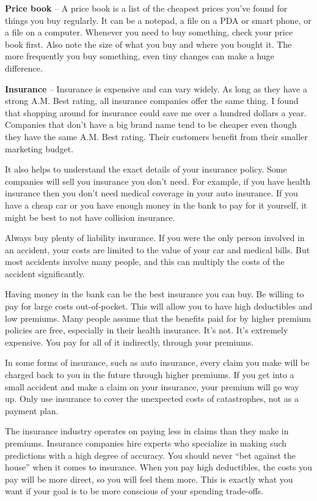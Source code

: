 \textbf{Price book} -- A price book is a list of the cheapest prices you've found for things you buy regularly. It can be a notepad, a file on a PDA or smart phone, or a file on a computer. Whenever you need to buy something, check your price book first. Also note the size of what you buy and where you bought it. The more frequently you buy something, even tiny changes can make a huge difference.

\textbf{Insurance} -- Insurance is expensive and can vary widely. As long as they have a strong A.M. Best rating, all insurance companies offer the same thing. I found that shopping around for insurance could save me over a hundred dollars a year. Companies that don't have a big brand name tend to be cheaper even though they have the same A.M. Best rating. Their customers benefit from their smaller marketing budget.

It also helps to understand the exact details of your insurance policy. Some companies will sell you insurance you don't need. For example, if you have health insurance then you don't need medical coverage in your auto insurance. If you have a cheap car or you have enough money in the bank to pay for it yourself, it might be best to not have collision insurance.

Always buy plenty of liability insurance. If you were the only person involved in an accident, your costs are limited to the value of your car and medical bills. But most accidents involve many people, and this can multiply the costs of the accident significantly.

Having money in the bank can be the best insurance you can buy. Be willing to pay for large costs out-of-pocket. This will allow you to have high deductibles and low premiums. Many people assume that the benefits paid for by higher premium policies are free, especially in their health insurance. It's not. It's extremely expensive. You pay for all of it indirectly, through your premiums.

In some forms of insurance, such as auto insurance, every claim you make will be charged back to you in the future through higher premiums. If you get into a small accident and make a claim on your insurance, your premium will go way up. Only use insurance to cover the unexpected costs of catastrophes, not as a payment plan.

The insurance industry operates on paying less in claims than they make in premiums. Insurance companies hire experts who specialize in making such predictions with a high degree of accuracy. You should never ``bet against the house'' when it comes to insurance. When you pay high deductibles, the costs you pay will be more direct, so you will feel them more. This is exactly what you want if your goal is to be more conscious of your spending trade-offs.

